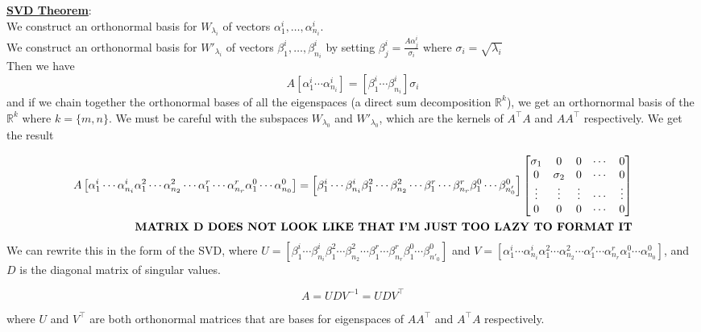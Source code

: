 \documentclass[11pt]{article}
\begin{document}
\newpage

\underline{\bf SVD Theorem}:\\
We construct an orthonormal basis for $W_{\lambda_i}$ of vectors $\alpha_1^i,\dots,\alpha_{n_i}^i$.\\
We construct an orthonormal basis for $W'_{\lambda_i}$ of vectors $\beta_1^i,\dots,\beta_{n_i}^i$ by setting $\beta_j^i = \frac{A\alpha^i_j}{\sigma_i}$ where $\sigma_i = \sqrt{\lambda_i}$\\
Then we have
\begin{equation*}
A \left[ \alpha_1^i \cdots \alpha_{n_i}^i\right] = \left[ \beta_1^i \cdots \beta_{n_i}^i\right] \sigma_i
\end{equation*}
and if we chain together the orthonormal bases of all the eigenspaces (a direct sum decomposition $\mathbb{R}^k$), we get an orthornormal basis of the $\mathbb{R}^k$ where $k = \{m,n\}$. We must be careful with the subspaces $W_{\lambda_0}$ and $W'_{\lambda_0}$, which are the kernels of $A^\intercal A$ and $AA^\intercal$ respectively. We get the result

\begin{eqnarray*}
A \left[ \alpha_1^i \cdots \alpha_{n_i}^i \alpha_1^2 \cdots \alpha_{n_2}^2 \cdots \alpha_1^r \cdots \alpha_{n_r}^r  \alpha_1^0 \cdots \alpha_{n_0}^0 \right] = \left[\beta_1^i \cdots \beta_{n_i}^i \beta_1^2 \cdots \beta_{n_2}^2 \cdots \beta_1^r \cdots \beta_{n_r}^r  \beta_1^0 \cdots \beta_{n'_0}^0 \right]
            \begin{bmatrix}
            \sigma_1 & 0 & 0 & \cdots & 0 \\
            0 & \sigma_2 & 0 & \cdots & 0\\
            \vdots & \vdots & \vdots & \cdots & \vdots \\ 
            0 & 0 & 0 & \cdots & 0
            \end{bmatrix}\\
\text{{\bf MATRIX D DOES NOT LOOK LIKE THAT I'M JUST TOO LAZY TO FORMAT IT}}
\end{eqnarray*}
We can rewrite this in the form of the SVD, where $U = \left[\beta_1^i \cdots \beta_{n_i}^i \beta_1^2 \cdots \beta_{n_2}^2 \cdots \beta_1^r \cdots \beta_{n_r}^r  \beta_1^0 \cdots \beta_{n'_0}^0 \right]$ and $V = \left[ \alpha_1^i \cdots \alpha_{n_i}^i \alpha_1^2 \cdots \alpha_{n_2}^2 \cdots \alpha_1^r \cdots \alpha_{n_r}^r  \alpha_1^0 \cdots \alpha_{n_0}^0 \right]$, and $D$ is the diagonal matrix of singular values.

\begin{equation*}
A = UDV^{-1} = UDV^\intercal
\end{equation*}

where $U$ and $V^\intercal$ are both orthonormal matrices that are bases for eigenspaces of $AA^\intercal$ and $A^\intercal A$ respectively.
\end{document}

